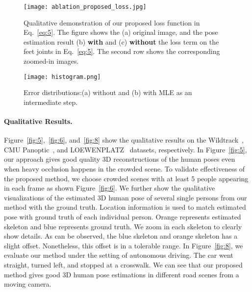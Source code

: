 \documentclass[runningheads]{llncs}
\begin{document}
\begin{figure}[!hbt]
\centering
  \texttt{[image: ablation\_proposed\_loss.jpg]}
  \caption{Qualitative demonstration of our proposed loss function in Eq.~\ref{eq:5}. The figure shows the (a) original image, and the pose estimation result (b) \textbf{with} and (c) \textbf{without} the loss term on the feet joints in Eq.~\ref{eq:5}. The second row shows the corresponding zoomed-in images.}  
  \label{fig:9}
\end{figure}
\begin{figure}[!hbt]
\centering
  \texttt{[image: histogram.png]}
  \caption{Error distributions:(a) without and (b) with MLE as an intermediate step.
}
  \label{fig:7}
\end{figure}

\paragraph {\bf{Qualitative Results. }} Figure~\ref{fig:5},~\ref{fig:6}, and~\ref{fig:8} show the qualitative results on the Wildtrack~\cite{Authors44}, CMU Panoptic~\cite{Authors47}, and LOEWENPLATZ~\cite{Authors48} datasets, respectively. In Figure~\ref{fig:5}, our approach gives good quality 3D reconstructions of the human poses even when heavy occlusion happens in the crowded scene. To validate effectiveness of the proposed method, we choose crowded scenes with at least 5 people appearing in each frame
as shown Figure~\ref{fig:6}. We further show the qualitative visualizations of the estimated 3D human pose of several single persons from our method with the ground truth. Location information is used to match estimated pose with ground truth of each individual person. Orange represents estimated skeleton and blue represents ground truth. We zoom in each skeleton to clearly show details. As can be observed, the blue skeleton and orange skeleton has a slight offset. Nonetheless, this offset is in a tolerable range. In Figure~\ref{fig:8}, we evaluate our method under the setting of autonomous driving. The car went straight, turned left, and stopped at a crosswalk. We can see that our proposed method gives good 3D human pose estimations in different road scenes from a moving camera.
\end{document}
